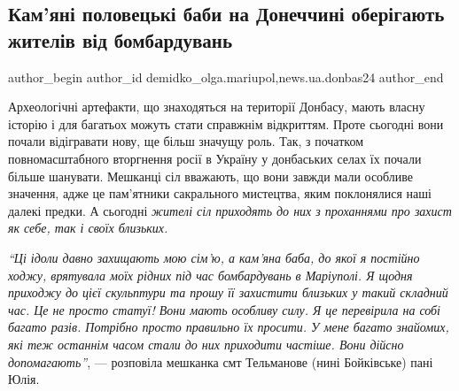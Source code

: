  
 
 
 
 
 
\subsection{Кам'яні половецькі баби на Донеччині оберігають жителів від бомбардувань}
\label{sec:29_06_2022.stz.news.ua.donbas24.1.kamjani_polovecki_baby_oberigajut_vid_bombarduvanj}
 
\ifcmt
 author_begin
   author_id demidko_olga.mariupol,news.ua.donbas24
 author_end
\fi

Археологічні артефакти, що знаходяться на території Донбасу, мають власну
історію і для багатьох можуть стати справжнім відкриттям. Проте сьогодні вони
почали відігравати нову, ще більш значущу роль. Так, з початком
повномасштабного вторгнення росії в Україну у донбаських селах їх почали більше
шанувати. Мешканці сіл вважають, що вони завжди мали особливе значення, адже це
пам'ятники сакрального мистецтва, яким поклонялися наші далекі предки. А
сьогодні \emph{жителі сіл приходять до них з проханнями про захист як себе, так і
своїх близьких.}

\begin{leftbar}
\emph{\enquote{Ці ідоли давно захищають мою сім'ю, а кам'яна баба, до якої я постійно
ходжу, врятувала моїх рідних під час бомбардувань в Маріуполі. Я щодня приходжу
до цієї скульптури та прошу її захистити близьких у такий складний час. Це не
просто статуї! Вони мають особливу силу. Я це перевірила на собі багато разів.
Потрібно просто правильно їх просити. У мене багато знайомих, які теж останнім
часом стали до них приходити частіше. Вони дійсно допомагають}}, — розповіла
мешканка смт Тельманове (нині Бойківське) пані Юлія.
\end{leftbar}


